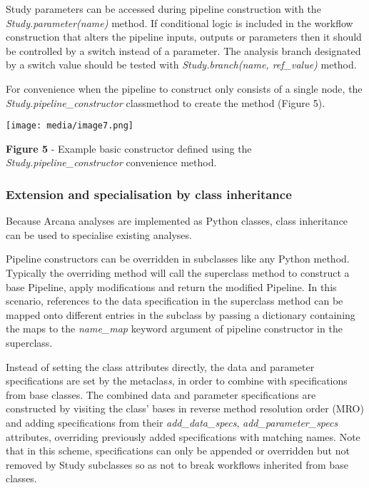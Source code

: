 Study parameters can be accessed during pipeline construction with the
\emph{Study.parameter(name)} method. If conditional logic is included in
the workflow construction that alters the pipeline inputs, outputs or
parameters then it should be controlled by a switch instead of a
parameter. The analysis branch designated by a switch value should be
tested with \emph{Study.branch(name, ref\_value)} method.

For convenience when the pipeline to construct only consists of a single
node, the \emph{Study.pipeline\_constructor} classmethod to create the
method (Figure 5).

\texttt{[image: media/image7.png]}

\textbf{Figure 5} - Example basic constructor defined using the
\emph{Study.pipeline\_constructor} convenience method.

\hypertarget{extension-and-specialisation-by-class-inheritance}{%
\subsubsection{Extension and specialisation by class
inheritance}\label{extension-and-specialisation-by-class-inheritance}}

Because Arcana analyses are implemented as Python classes, class
inheritance can be used to specialise existing analyses.

Pipeline constructors can be overridden in subclasses like any Python
method. Typically the overriding method will call the superclass method
to construct a base Pipeline, apply modifications and return the
modified Pipeline. In this scenario, references to the data
specification in the superclass method can be mapped onto different
entries in the subclass by passing a dictionary containing the maps to
the \emph{name\_map} keyword argument of pipeline constructor in the
superclass.

Instead of setting the class attributes directly, the data and parameter
specifications are set by the metaclas\emph{s}, in order to combine with
specifications from base classes. The combined data and parameter
specifications are constructed by visiting the class' bases in reverse
method resolution order (MRO) and adding specifications from their
\emph{add\_data\_specs}, \emph{add\_parameter\_specs} attributes,
overriding previously added specifications with matching names. Note
that in this scheme, specifications can only be appended or overridden
but not removed by Study subclasses so as not to break workflows
inherited from base classes.

